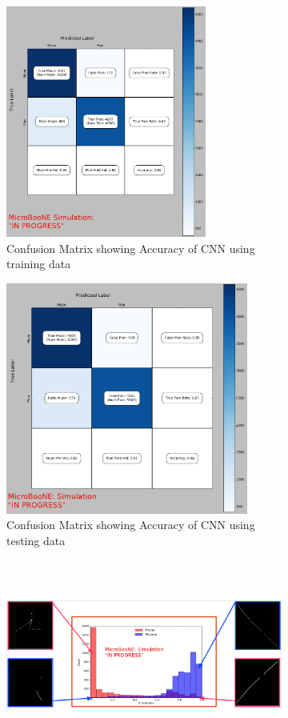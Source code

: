 \begin{figure}[htp!]
\centering
	\begin{subfigure}[b]{.4\textwidth}
	\includegraphics[width=\textwidth,height=3in]{figs/train_confusion-9-14-16.png}
	\caption{Confusion Matrix showing Accuracy of CNN using training data}
	\label{fig:confusion}
	\end{subfigure}
	\quad
	\begin{subfigure}[b]{.4\textwidth}
	\includegraphics[width=\textwidth,height=3in]{figs/val_confusion_9-14-16.png}
	\caption{Confusion Matrix showing Accuracy of CNN using testing data}
	\label{fig:confusion_test}
	\end{subfigure}
	\quad
	\begin{subfigure}[b]{\textwidth}
	\includegraphics[width=\textwidth,height=2.5in]{figs/mitch_hw.png}

\end{subfigure}
\end{figure}
